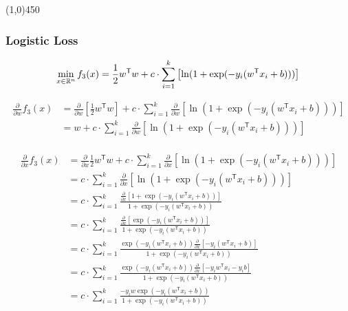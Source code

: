 \documentclass[12pt,landscape]{article}
\newcommand{\hr}{\begin{center} \line(1,0){450} \end{center}}
\newcommand{\tr}{^\mathsf{T}}
\begin{document}
\hr
\subsubsection*{Logistic Loss}
\newcommand{\zLog}{1+\exp(-y_i (w\tr x_i + b))}

\begin{equation}
\min\limits_{x \in \mathbb{R}^n} f_3(x) = \frac{1}{2} w\tr w +c \cdot \sum\limits_{i=1}^k \left[ \ln(\zLog)\right]\\
\end{equation}

\begin{align*}
\frac{\partial}{\partial w} f_3(x) &= \frac{\partial}{\partial w} \left[ \frac{1}{2} w\tr w \right] +c \cdot \sum\limits_{i=1}^k \frac{\partial}{\partial w} \left[ \ln(\zLog)\right]\\
&= w +c \cdot \sum\limits_{i=1}^k \frac{\partial}{\partial w} \left[ \ln(\zLog)\right]\\
\end{align*}

\begin{align*}
\frac{\partial}{\partial x} f_3(x) &= \frac{\partial}{\partial x} \frac{1}{2} w\tr w +c \cdot \sum\limits_{i=1}^k \frac{\partial}{\partial x} \left[ \ln(\zLog)\right]\\
&= c \cdot \sum\limits_{i=1}^k \frac{\partial}{\partial x} \left[ \ln(1+\exp(-y_i\left(w\tr x_i + b \right) ))\right] \\
&= c \cdot \sum\limits_{i=1}^k \frac{\frac{\partial}{\partial x} \left[ 1+\exp(-y_i(w\tr x_i + b)) \right]} {\zLog} \\
&= c \cdot \sum\limits_{i=1}^k \frac{\frac{\partial}{\partial x} \left[ \exp(-y_i(w\tr x_i + b))\right]}{\zLog} \\
&= c \cdot \sum\limits_{i=1}^k \frac{ \exp(-y_i(w\tr x_i + b)) \frac{\partial}{\partial x} \left[ -y_i (w\tr x_i + b)  \right]}{\zLog}\\
&= c \cdot \sum\limits_{i=1}^k \frac{ \exp(-y_i(w\tr x_i + b)) \frac{\partial}{\partial x} \left[ -y_i w\tr x_i -y_i b \right]}{\zLog}\\
&= c \cdot \sum\limits_{i=1}^k \frac{ -y_i w\exp(-y_i(w\tr x_i + b)) }{\zLog}\\
\end{align*}

\newcommand{\dLogz}{-y_i w \exp(-y_i(w\tr x_i + b))}
\newcommand{\dLogn}{\zLog}
\end{document}

